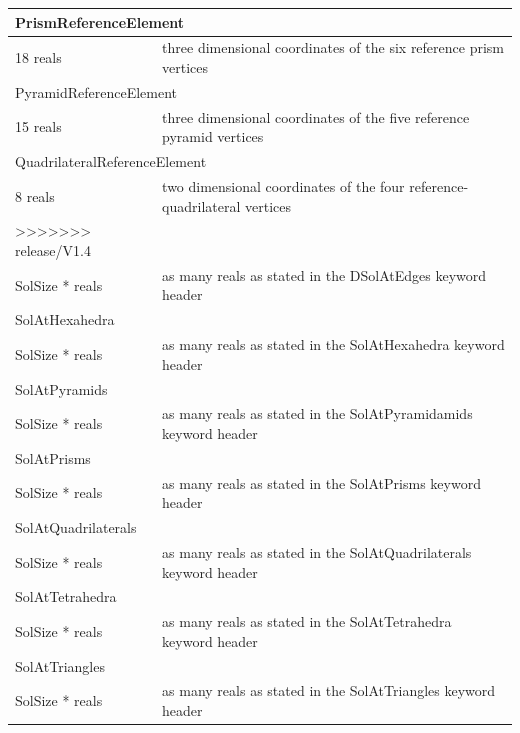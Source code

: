 \documentclass[a4paper,12pt]{article}
\begin{document}
\begin{longtable}{|m{4cm}|m{11cm}|}
\multicolumn{2}{|l|}{PrismReferenceElement} \\
\hline
18 reals & three dimensional coordinates of the six reference prism vertices \\
\hline\hline

\multicolumn{2}{|l|}{PyramidReferenceElement} \\
\hline
15 reals & three dimensional coordinates of the five reference pyramid vertices \\
\hline\hline

\multicolumn{2}{|l|}{QuadrilateralReferenceElement} \\
\hline
8 reals & two dimensional coordinates of the four reference-quadrilateral vertices \\
>>>>>>> release/V1.4
\hline\hline

\multicolumn{2}{|l|}{SolAtEdges} \\
\hline
SolSize * reals & as many reals as stated in the DSolAtEdges keyword header \\
\hline\hline

\multicolumn{2}{|l|}{SolAtHexahedra} \\
\hline
SolSize * reals & as many reals as stated in the SolAtHexahedra keyword header \\
\hline\hline

\multicolumn{2}{|l|}{SolAtPyramids} \\
\hline
SolSize * reals & as many reals as stated in the SolAtPyramidamids keyword header \\
\hline\hline

\multicolumn{2}{|l|}{SolAtPrisms} \\
\hline
SolSize * reals & as many reals as stated in the SolAtPrisms keyword header \\
\hline\hline

\multicolumn{2}{|l|}{SolAtQuadrilaterals} \\
\hline
SolSize * reals & as many reals as stated in the SolAtQuadrilaterals keyword header \\
\hline\hline

\multicolumn{2}{|l|}{SolAtTetrahedra} \\
\hline
SolSize * reals & as many reals as stated in the SolAtTetrahedra keyword header \\
\hline\hline

\multicolumn{2}{|l|}{SolAtTriangles} \\
\hline
SolSize * reals & as many reals as stated in the SolAtTriangles keyword header \\
\hline\hline


\end{longtable}
\end{document}
